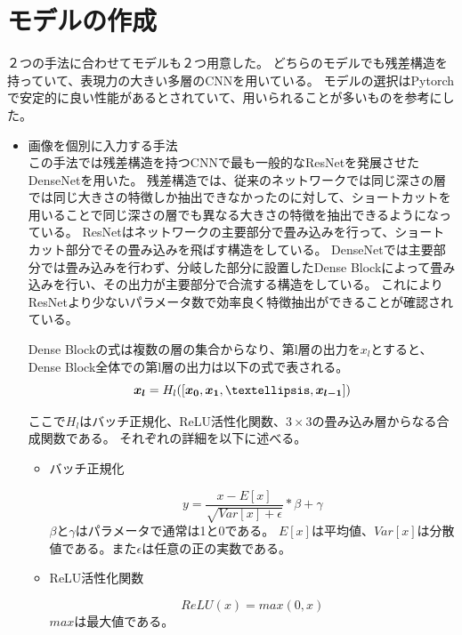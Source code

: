 \section{モデルの作成}
２つの手法に合わせてモデルも２つ用意した。
どちらのモデルでも残差構造を持っていて、表現力の大きい多層のCNNを用いている。
モデルの選択はPytorchで安定的に良い性能があるとされていて、用いられることが多いものを参考にした。
\begin{itemize}
    \item 画像を個別に入力する手法\\
この手法では残差構造を持つCNN\cite{CNN}で最も一般的なResNet\cite{ResNet}を発展させたDenseNet\cite{DenseNet}を用いた。
残差構造では、従来のネットワークでは同じ深さの層では同じ大きさの特徴しか抽出できなかったのに対して、ショートカットを用いることで同じ深さの層でも異なる大きさの特徴を抽出できるようになっている。
ResNet\cite{ResNet}はネットワークの主要部分で畳み込みを行って、ショートカット部分でその畳み込みを飛ばす構造をしている。
DenseNet\cite{DenseNet}では主要部分では畳み込みを行わず、分岐した部分に設置したDense Blockによって畳み込みを行い、その出力が主要部分で合流する構造をしている。
これによりResNet\cite{ResNet}より少ないパラメータ数で効率良く特徴抽出ができることが確認されている。

Dense Blockの式は複数の層の集合からなり、第l層の出力を\mbox{\boldmath $x_l$}とすると、Dense Block全体での第l層の出力は以下の式で表される。
\begin{equation}
    \mbox{\boldmath $x_l$} = H_l([\mbox{\boldmath $x_0$}, \mbox{\boldmath $x_1$}, … , \mbox{\boldmath $x_{l-1}$}])
\end{equation}

ここで$H_l$はバッチ正規化、ReLU活性化関数、$3 \times 3$の畳み込み層からなる合成関数である。
それぞれの詳細を以下に述べる。

\begin{itemize}
    \item バッチ正規化

    \begin{equation}
         y = \frac{x - E[x]}{\sqrt{Var[x] + \epsilon}} * \beta + \gamma
    \end{equation}
    $\beta$と$\gamma$はパラメータで通常は1と0である。
    $E[x]$は平均値、$Var[x]$は分散値である。また$\epsilon$は任意の正の実数である。

    \item ReLU活性化関数

    \begin{equation}
         ReLU(x) = max(0, x)
    \end{equation}
    $max$は最大値である。


\end{itemize}
\end{itemize}
